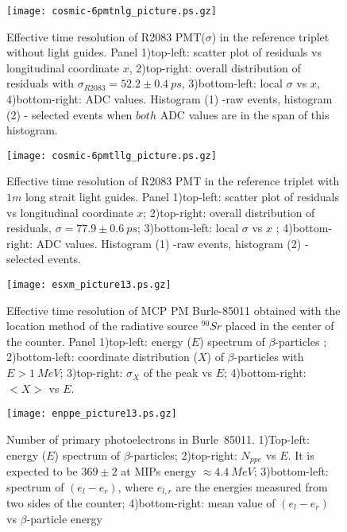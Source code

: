 \begin{figure}[htbp]%
\begin{center}
\texttt{[image: cosmic-6pmtnlg\_picture.ps.gz]}
\end{center}
\caption{%
Effective time resolution of R2083 PMT($\sigma$)
 in the reference triplet without 
light guides. Panel
1)top-left: scatter plot of residuals vs longitudinal coordinate $x$,
2)top-right: overall distribution of residuals with $\sigma_{R2083}=52.2\pm0.4~ps$, 
3)bottom-left: local $\sigma$ vs $x$,
4)bottom-right:  ADC values. Histogram (1) -raw events, histogram (2) - selected events when $both$ ADC values
are in the  span of this histogram.
\label{nlgres}}
\end{figure}


\begin{figure}[htbp]%
\begin{center}
\texttt{[image: cosmic-6pmtllg\_picture.ps.gz]}
\end{center}
\caption{%
Effective time resolution of R2083 PMT in the reference triplet with $1m$ long strait 
light guides. Panel  
1)top-left:     scatter plot of residuals vs longitudinal coordinate $x$;
2)top-right:    overall distribution of residuals, $\sigma=77.9\pm0.6~ps$; 
3)bottom-left:  local $\sigma$ vs $x$ ;
4)bottom-right: ADC values. Histogram (1) -raw events, histogram (2) - selected events.
\label{lgres}}
\end{figure}
\clearpage


\begin{figure}[htbp]%
\begin{center}
\texttt{[image: esxm\_picture13.ps.gz]}
\end{center}
\caption{
Effective time resolution of MCP PM Burle-85011   
obtained with the location method  of the 
 radiative source $^{90}Sr$   placed  in the center of the   counter.
Panel 
1)top-left: energy ($E$) spectrum of $\beta$-particles ;
2)bottom-left: coordinate distribution ($X$) of $\beta$-particles  with $E>1~MeV$; 
3)top-right: $\sigma_{X}$ of the peak vs $E$; 
4)bottom-right: $<X>$ vs  $E$.
\label{mcp85011sample}}
\end{figure}
\clearpage


\begin{figure}[htbp]%
\begin{center}
\texttt{[image: enppe\_picture13.ps.gz]}
\end{center}
\caption{Number of primary photoelectrons in Burle~85011.
1)Top-left: energy ($E$) spectrum of $\beta$-particles;
2)top-right:  $N_{ppe}$ vs $E$. It is expected to be $369\pm2$ at MIPs energy  $\approx4.4~MeV$;
3)bottom-left: spectrum of $(e_l-e_r)$, where $e_{l,r}$ are the energies measured from two sides of the counter;
4)bottom-right: mean value of $(e_l-e_r)$ vs  $\beta$-particle energy
\label{mcpnppe85011}}
\end{figure}
\clearpage


